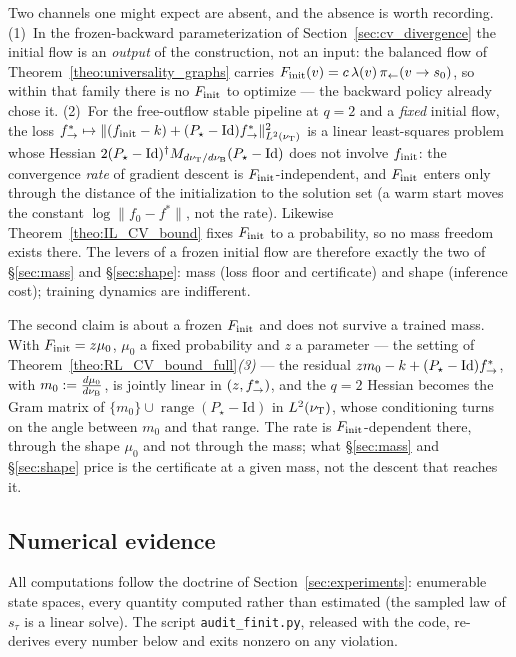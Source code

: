 \begin{remark}\label{rem:training}
Two channels one might expect are absent, and the absence is worth recording.
(1)~In the frozen-backward parameterization of Section~\ref{sec:cv_divergence} the initial
flow is an \emph{output} of the construction, not an input: the balanced flow of
Theorem~\ref{theo:universality_graphs} carries
$F_{\mathrm{init}}(v)=c\,\lambda(v)\,\pi_{\leftarrow}(v\rightarrow s_0)$, so within that family there
is no $F_{\mathrm{init}}$ to optimize --- the backward policy already chose it.
(2)~For the free-outflow stable pipeline at $q=2$ and a \emph{fixed} initial flow, the loss
$f^*_{\rightarrow}\mapsto\|(f_{\mathrm{init}}-k)+(P_\star-\mathrm{Id})f^*_{\rightarrow}\|^2_{L^2(\nu_{\mathrm{T}})}$ is a
linear least-squares problem whose Hessian $2(P_\star-\mathrm{Id})^\dagger
M_{d\nu_{\mathrm{T}}/d\nu_{\mathrm{B}}}(P_\star-\mathrm{Id})$ does not involve $f_{\mathrm{init}}$: the convergence
\emph{rate} of gradient descent is $F_{\mathrm{init}}$-independent, and $F_{\mathrm{init}}$ enters only through
the distance of the initialization to the solution set (a warm start moves the constant
$\log\|f_0-f^*\|$, not the rate). Likewise Theorem~\ref{theo:IL_CV_bound} fixes $F_{\mathrm{init}}$ to
a probability, so no mass freedom exists there. The levers of a frozen initial flow are
therefore exactly the two of \S\ref{sec:mass} and \S\ref{sec:shape}: mass (loss floor and
certificate) and shape (inference cost); training dynamics are indifferent.

The second claim is about a frozen $F_{\mathrm{init}}$ and does not survive a trained mass. With
$F_{\mathrm{init}}=z\mu_0$, $\mu_0$ a fixed probability and $z$ a parameter --- the setting of
Theorem~\ref{theo:RL_CV_bound_full}\emph{(3)} --- the residual
$zm_0-k+(P_\star-\mathrm{Id})f^*_{\rightarrow}$, with $m_0:=\frac{d\mu_0}{d\nu_{\mathrm{B}}}$, is jointly linear
in $(z,f^*_{\rightarrow})$, and the $q=2$ Hessian becomes the Gram matrix of
$\{m_0\}\cup\operatorname{range}(P_\star-\mathrm{Id})$ in $L^2(\nu_{\mathrm{T}})$, whose conditioning
turns on the angle between $m_0$ and that range. The rate is $F_{\mathrm{init}}$-dependent there,
through the shape $\mu_0$ and not through the mass; what \S\ref{sec:mass} and
\S\ref{sec:shape} price is the certificate at a given mass, not the descent that reaches
it.
\end{remark}

\subsection{Numerical evidence}\label{sec:num_finit}

All computations follow the doctrine of Section~\ref{sec:experiments}: enumerable state
spaces, every quantity computed rather than estimated (the sampled law of $s_\tau$ is a
linear solve). The script \texttt{audit\_finit.py}, released with the code, re-derives
every number below and exits nonzero on any violation.

